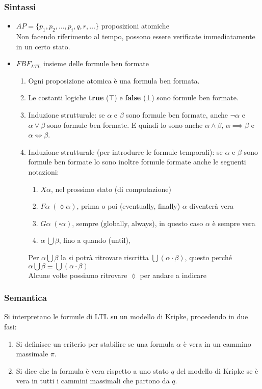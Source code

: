 \subsubsection{Sintassi}
\begin{itemize}
    \item $AP = \{p_1, p_2, \dots, p_i, q, r,  \dots\}$	proposizioni atomiche\\
        Non facendo riferimento al tempo, possono essere verificate immediatamente in un certo stato.
    \item $FBF_{LTL}$	insieme delle formule ben formate
        \begin{enumerate}
            \item Ogni proposizione atomica è una formula ben formata.
            \item Le costanti logiche \textbf{true} ($\top$) e \textbf{false} ($\bot$) sono formule ben formate.
            \item Induzione strutturale: se $\alpha$ e $\beta$ sono formule ben formate, anche $\neg \alpha$ e $\alpha \lor \beta$ sono formule ben formate. E quindi lo sono anche $\alpha \land \beta$, $\alpha \implies \beta$ e $\alpha \iff \beta$.
            \item Induzione strutturale (per introdurre le formule temporali): se $\alpha$ e $\beta$ sono formule ben formate lo sono inoltre formule formate anche le seguenti notazioni:
            \begin{enumerate}
                \item $X \alpha$, nel prossimo stato (di computazione)
                \item $F \alpha \;(\lozenge \alpha)$, prima o poi (eventually, finally) $\alpha$ diventerà vera
                \item $G \alpha \; (\square \alpha)$, sempre (globally, always), in questo caso $\alpha$ è sempre vera
                \item $\alpha\  \bigcup \beta$, fino a quando (until), 
            \end{enumerate}
            Per $\alpha \bigcup \beta$ la si potrà ritrovare riscritta $\bigcup(\alpha \cdot \beta)$, questo perché $\alpha \bigcup \beta \equiv \bigcup(\alpha \cdot \beta)$\\
            Alcune volte possiamo ritrovare $\lozenge$ per andare a indicare
        \end{enumerate}
\end{itemize}

\subsubsection{Semantica}
Si interpretano le formule di LTL su un modello di Kripke, procedendo in due fasi:
\begin{enumerate}
    \item Si definisce un criterio per stabilire se una formula $\alpha$ è vera in un cammino massimale $\pi$.
    \item Si dice che la formula è vera rispetto a uno stato $q$ del modello di Kripke se è vera in tutti i cammini massimali che partono da $q$.
\end{enumerate}

